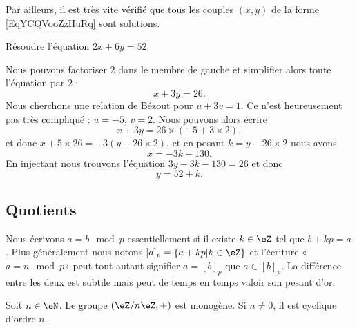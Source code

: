 Par ailleurs, il est très vite vérifié que tous les couples \( (x,y)\) de la forme \eqref{EqYCQVooZzHuRq} sont solutions.

\begin{example}
	Résoudre l'équation \( 2x+6y=52\).

	Nous pouvons factoriser \( 2\) dans le membre de gauche et simplifier alors toute l'équation par \( 2\) :
	\begin{equation}
		x+3y=26.
	\end{equation}
	Nous cherchons une relation de Bézout pour \( u+3v=1\). Ce n'est heureusement pas très compliqué : \( u=-5\), \( v=2\). Nous pouvons alors écrire
	\begin{equation}
		x+3y=26\times (-5+3\times 2),
	\end{equation}
	et donc \( x+5\times 26=-3(y-26\times 2)\), et en posant \( k=y-26\times 2\) nous avons
	\begin{equation}
		x=-3k-130.
	\end{equation}
	En injectant nous trouvons l'équation \( 3y-3k-130=26\) et donc
	\begin{equation}
		y=52+k.
	\end{equation}
\end{example}

\subsection{Quotients}

Nous écrivons \( a=b\mod p\) essentiellement si il existe \( k\in \eZ\) tel que \( b+kp=a\). Plus généralement nous notons \( [a]_p=\{ a+kp|k\in \eZ \}\) et l'écriture «\( a=n\mod p\)» peut tout autant signifier \( a=[b]_p\) que \( a\in [b]_p\). La différence entre les deux est subtile mais peut de temps en temps valoir son pesant d'or.

\begin{proposition}
	Soit \( n\in\eN\). Le groupe \( (\eZ/n\eZ, +)\) est monogène. Si \( n\neq 0\), il est cyclique d'ordre \( n\).
\end{proposition}

